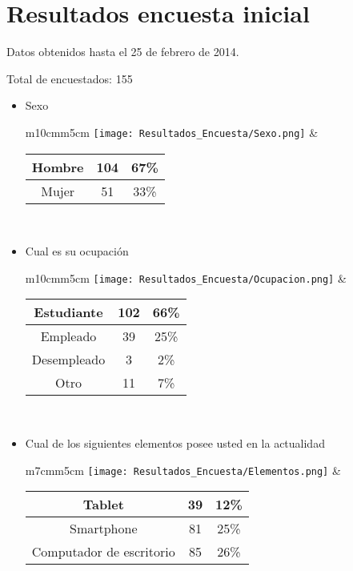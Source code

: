 \chapter{Resultados encuesta inicial} 
\label{app:resultado_encuesta}

\begin{center}
Datos obtenidos hasta el 25 de febrero de 2014.
\end{center}
Total de encuestados: 155
\begin{itemize}
  \item Sexo \\
      \begin{tabular}{m{10cm}m{5cm}}
        \texttt{[image: Resultados\_Encuesta/Sexo.png]} &
        \begin{tabular}{|c|cc|}
        \hline
         Hombre & 104 & 67\% \\ \hline
         Mujer & 51 &  33\%\\ \hline 
        \end{tabular} \\
      \end{tabular}
  \item Cual es su ocupación \\
      \begin{tabular}{m{10cm}m{5cm}}
        \texttt{[image: Resultados\_Encuesta/Ocupacion.png]} &
        \begin{tabular}{|c|cc|}
        \hline
         Estudiante & 102 & 66\% \\ \hline
         Empleado & 39 & 25\% \\ \hline 
         Desempleado & 3 & 2\% \\ \hline
         Otro & 11 & 7\% \\ \hline
        \end{tabular} \\
      \end{tabular}
  \item Cual de los siguientes elementos posee usted en la actualidad \\
      \begin{tabular}{m{7cm}m{5cm}}
        \texttt{[image: Resultados\_Encuesta/Elementos.png]} &
        \begin{tabular}{|c|cc|}
        \hline
         Tablet & 39 & 12\% \\ \hline
         Smartphone & 81 & 25\% \\ \hline
         Computador de escritorio & 85 & 26\% \\ \hline

\end{tabular}
\end{tabular}
\end{itemize}

